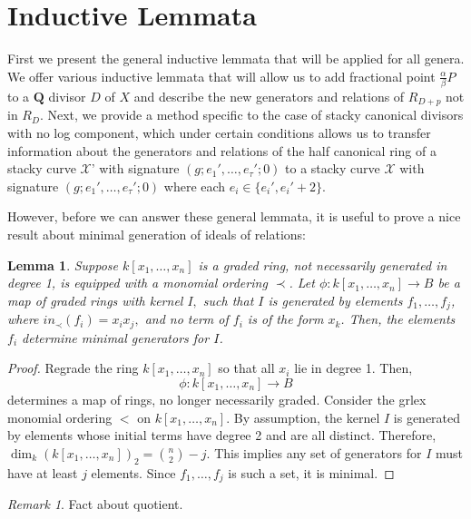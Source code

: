 \documentclass{amsart}
\theoremstyle{plain}
\newtheorem{lem}[thm]{Lemma}
\theoremstyle{definition}
\theoremstyle{remark}
\newtheorem{rem}[thm]{Remark}
\numberwithin{equation}{section}
\newcommand \sx{\mathscr X}
\begin{document}
\section{Inductive Lemmata}
First we present the general inductive lemmata that will be applied
for all genera.  We offer various inductive lemmata that will allow us to add fractional point $\frac{\alpha}{\beta}P$ to a $\mathbf{Q}$ divisor $D$ of $X$ and describe the new generators and relations of $R_{D+p}$ not in $R_D$.  Next, we provide a method specific to the case of stacky canonical divisors with no log component, which under certain conditions allows us to transfer information about the generators and relations of the half canonical ring of a stacky curve $\sx$' with signature $(g; e_1', \ldots, e_\tau'; 0)$ to a stacky curve $\sx$ with signature $(g; e_1', \ldots, e_\tau'; 0)$ where each $e_i\in \{e_i', e_i'+2\}$.    

However, before we can answer these general lemmata, it is useful to prove a nice result about minimal generation of ideals of relations:
\begin{lem}
\label{lem:minimal_quadratic}
Suppose $k[x_1,\ldots, x_n]$ is a graded ring, not necessarily
generated in degree 1, is equipped with a monomial ordering $\prec$.
 Let $\phi:k[x_1,\ldots, x_n] \rightarrow B$ be a map of graded
rings with kernel $I,$ such that $I$ is generated by elements $f_1,
\ldots, f_j$, where $in_\prec(f_i) = x_ix_j,$ and no term of $f_i$
is of the form $x_k$. Then, the elements $f_i$ determine minimal
generators for $I$.
\end{lem}
\begin{proof}
Regrade the ring $k[x_1, \ldots, x_n]$ so that all $x_i$ lie in
degree 1. Then,
\[
	\phi : k[x_1, \ldots, x_n] \rightarrow B
\]
\noindent
determines a map of rings, no longer necessarily graded. Consider
the grlex monomial ordering $<$ on $k[x_1, \ldots, x_n]$.
By
assumption, the kernel $I$ is generated by elements whose initial
terms have degree 2 and are all distinct. Therefore, $\dim_k (k[x_1,
\ldots, x_n])_2 = \binom{n}{2}-j.$ This implies any set of
generators for $I$ must have at least $j$ elements. Since $f_1,
\ldots, f_j$ is such a set, it is minimal.
\end{proof}

\begin{rem}
Fact about quotient.
\end{rem}
\end{document}
